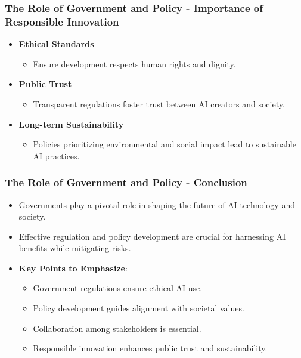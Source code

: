 \documentclass{beamer}
\begin{document}
\begin{frame}[fragile]
    \frametitle{The Role of Government and Policy - Importance of Responsible Innovation}
    \begin{itemize}
        \item \textbf{Ethical Standards} 
            \begin{itemize}
                \item Ensure development respects human rights and dignity.
            \end{itemize}
        \item \textbf{Public Trust} 
            \begin{itemize}
                \item Transparent regulations foster trust between AI creators and society.
            \end{itemize}
        \item \textbf{Long-term Sustainability} 
            \begin{itemize}
                \item Policies prioritizing environmental and social impact lead to sustainable AI practices.
            \end{itemize}
    \end{itemize}
\end{frame}

\begin{frame}[fragile]
    \frametitle{The Role of Government and Policy - Conclusion}
    \begin{itemize}
        \item Governments play a pivotal role in shaping the future of AI technology and society.
        \item Effective regulation and policy development are crucial for harnessing AI benefits while mitigating risks.
        \item \textbf{Key Points to Emphasize}:
            \begin{itemize}
                \item Government regulations ensure ethical AI use.
                \item Policy development guides alignment with societal values.
                \item Collaboration among stakeholders is essential.
                \item Responsible innovation enhances public trust and sustainability.
            \end{itemize}
    \end{itemize}
\end{frame}
\end{document}
